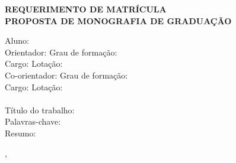 \documentclass[a4paper, 12pt]{paper}
\begin{document}
	
	\begin{center}\Large \bf REQUERIMENTO DE MATRÍCULA\\ 
		PROPOSTA DE MONOGRAFIA DE GRADUAÇÃO
	\end{center}
	Aluno: \dotuline{\student} \dotfill \\
	Orientador: \dotuline{\advisorName} \dotfill Grau de formação:  \dotuline{\advisorDegree} \dotfill  \\
	Cargo: \dotuline{\advisorPosition}\dotfill Lotação: \dotuline{\advisorLotacao}\dotfill \\
	Co-orientador: \dotuline{\coadvisorName} \dotfill Grau de formação:  \dotuline{\coadvisorDegree} \dotfill  \\
	Cargo: \dotuline{\coadvisorPosition}\dotfill Lotação: \dotuline{\coadvisorLotacao}\dotfill
	\\
	\\
	Título do trabalho: \dotuline{\thesisTitle}\dotfill \\
	Palavras-chave: \dotuline{\thesisKeywords} \dotfill \\
	Resumo: \dotuline{\thesisResume} \dotfill
	\dotcolumnfill
	
	\local, \dateRequirement
	
\end{document}

